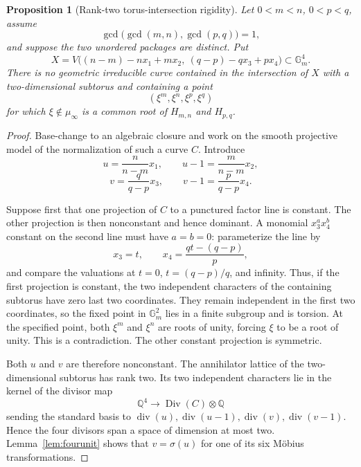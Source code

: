 \documentclass[11pt]{article}
\newtheorem{proposition}[theorem]{Proposition}
\theoremstyle{definition}
\newcommand{\Q}{\mathbb Q}
\begin{document}
\begin{proposition}[Rank-two torus-intersection rigidity]
\label{prop:ranktworigidity}
Let \(0<m<n\), \(0<p<q\), assume
\[
 \gcd\bigl(\gcd(m,n),\gcd(p,q)\bigr)=1,
\]
and suppose the two unordered packages are distinct.  Put
\[
 X=V\bigl((n-m)-nx_1+mx_2,\ (q-p)-qx_3+px_4\bigr)
 \subset\mathbb G_m^4.
\]
There is no geometric irreducible curve contained in the intersection of
\(X\) with a two-dimensional subtorus and containing a point
\[
 (\xi^m,\xi^n,\xi^p,\xi^q)
\]
for which \(\xi\notin\mu_\infty\) is a common root of
\(H_{m,n}\) and \(H_{p,q}\).
\end{proposition}

\begin{proof}
Base-change to an algebraic closure and work on the smooth projective model
of the normalization of such a curve \(C\).  Introduce
\[
 u=\frac{n}{n-m}x_1,
 \qquad u-1=\frac{m}{n-m}x_2,
\]
\[
 v=\frac{q}{q-p}x_3,
 \qquad v-1=\frac{p}{q-p}x_4.
\]

Suppose first that one projection of \(C\) to a punctured factor line is
constant.  The other projection is then nonconstant and hence dominant.  A
monomial \(x_3^a x_4^b\) constant on the second line must have
\(a=b=0\): parameterize the line by
\[
 x_3=t,
 \qquad
 x_4=\frac{qt-(q-p)}p,
\]
and compare the valuations at \(t=0\), \(t=(q-p)/q\), and infinity.
Thus, if the first projection is constant, the two independent characters
of the containing subtorus have zero last two coordinates.  They remain
independent in the first two coordinates, so the fixed point in
\(\mathbb G_m^2\) lies in a finite subgroup and is torsion.  At the
specified point, both \(\xi^m\) and \(\xi^n\) are roots of unity, forcing
\(\xi\) to be a root of unity.  This is a contradiction.  The other
constant projection is symmetric.

Both \(u\) and \(v\) are therefore nonconstant.  The annihilator lattice
of the two-dimensional subtorus has rank two.  Its two independent
characters lie in the kernel of the divisor map
\[
 \Q^4\longrightarrow\operatorname{Div}(C)\otimes\Q
\]
sending the standard basis to
\(\operatorname{div}(u),\operatorname{div}(u-1),
\operatorname{div}(v),\operatorname{div}(v-1)\).  Hence the four divisors
span a space of dimension at most two.  Lemma~\ref{lem:fourunit} shows that
\(v=\sigma(u)\) for one of its six Möbius transformations.


\end{proof}
\end{document}
